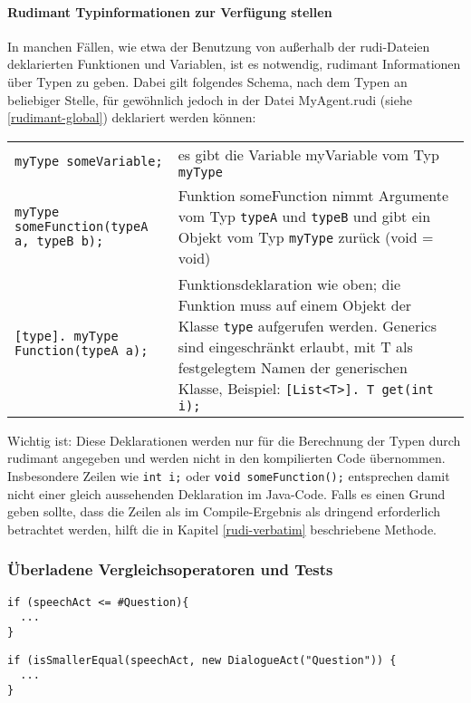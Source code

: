\paragraph{Rudimant Typinformationen zur Verfügung stellen}

In manchen Fällen, wie etwa der Benutzung von außerhalb der rudi-Dateien
deklarierten Funktionen und Variablen, ist es notwendig, rudimant Informationen
über Typen zu geben. Dabei gilt folgendes Schema, nach dem Typen an beliebiger
Stelle, für gewöhnlich jedoch in der Datei MyAgent.rudi (siehe
\ref{rudimant-global}) deklariert werden können:\\
\vspace*{2ex}
\noindent
\begin{tabular}{ll}
\texttt{myType someVariable;}
 &  es gibt die Variable myVariable vom Typ \texttt{myType} \\
    
\texttt{myType someFunction(typeA a, typeB b);} &  Funktion someFunction nimmt Argumente vom Typ \texttt{typeA} und \texttt{typeB} und gibt ein Objekt vom Typ \texttt{myType} zurück (void = void) \\
    
\texttt{[type]. myType Function(typeA a);} & Funktionsdeklaration wie oben; die Funktion muss auf einem Objekt der Klasse \texttt{type} aufgerufen werden. Generics sind eingeschränkt erlaubt, mit T als festgelegtem Namen der generischen Klasse, Beispiel: \texttt{[List<T>]. T get(int i);}
\end{tabular}

Wichtig ist: Diese Deklarationen werden nur für die Berechnung der Typen durch rudimant angegeben und werden nicht in den kompilierten Code übernommen. Insbesondere Zeilen wie \texttt{int i;} oder \texttt{void someFunction();} entsprechen damit nicht einer gleich aussehenden Deklaration im Java-Code. Falls es einen Grund geben sollte, dass die Zeilen als im Compile-Ergebnis als dringend erforderlich betrachtet werden, hilft die in Kapitel \ref{rudi-verbatim} beschriebene Methode.

\subsubsection{Überladene Vergleichsoperatoren und Tests}

\begin{small}
\begin{minipage}{0.4\textwidth}
\begin{verbatim}
if (speechAct <= #Question){
  ...
}
\end{verbatim}
\end{minipage}
\begin{minipage}{0.6\textwidth}
\begin{verbatim}
if (isSmallerEqual(speechAct, new DialogueAct("Question")) {
  ...
}
\end{verbatim}
\end{minipage}
\end{small}


